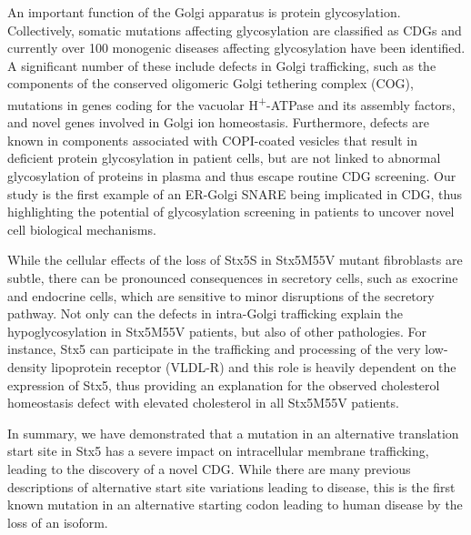 An important function of the Golgi apparatus is protein glycosylation\cite{ohtsubo_glycosylation_2006}. Collectively, somatic mutations affecting glycosylation are classified as CDGs and currently over 100 monogenic diseases affecting glycosylation have been identified\cite{freeze_solving_2014,fisher_bridging_2016}. A significant number of these include defects in Golgi trafficking, such as the components of the conserved oligomeric Golgi tethering complex (COG)\cite{reynders_golgi_2009,blackburn_more_2018,foulquier_conserved_2006,foulquier_new_2007,kranz_cog8_2007,miller_recognition_2012,morava_common_2007,ng_molecular_2007,wu_mutation_2004}, mutations in genes coding for the vacuolar H\textsuperscript{+}-ATPase and its assembly factors\cite{hucthagowder_loss--function_2009,jansen_ccdc115_2016,jansen_tmem199_2016,jansen_atp6ap1_2016}, and novel genes involved in Golgi ion homeostasis\cite{foulquier_tmem165_2012,ashikov_integrating_2018,park_slc39a8_2015}. Furthermore, defects are known in components associated with COPI-coated vesicles\cite{witkos_gorab_2019} that result in deficient protein glycosylation in patient cells, but are not linked to abnormal glycosylation of proteins in plasma and thus escape routine CDG screening. Our study is the first example of an ER-Golgi SNARE being implicated in CDG, thus highlighting the potential of glycosylation screening in patients to uncover novel cell biological mechanisms.

While the cellular effects of the loss of Stx5S in Stx5M55V mutant fibroblasts are subtle, there can be pronounced consequences in secretory cells, such as exocrine and endocrine cells, which are sensitive to minor disruptions of the secretory pathway\cite{ohtsubo_glycosylation_2006,witkos_gorab_2019,zhong_golgi_2011,zhao_membrane_2012}. Not only can the defects in intra-Golgi trafficking explain the hypoglycosylation in Stx5M55V patients, but also of other pathologies. For instance, Stx5 can participate in the trafficking and processing of the very low-density lipoprotein receptor (VLDL-R) and this role is heavily dependent on the expression of Stx5\cite{wagner_stx5_2013}, thus providing an explanation for the observed cholesterol homeostasis defect with elevated cholesterol in all Stx5M55V patients.

In summary, we have demonstrated that a mutation in an alternative translation start site in Stx5 has a severe impact on intracellular membrane trafficking, leading to the discovery of a novel CDG. While there are many previous descriptions of alternative start site variations leading to disease\cite{bogaert_n-terminal_2020}, this is the first known mutation in an alternative starting codon leading to human disease by the loss of an isoform.

